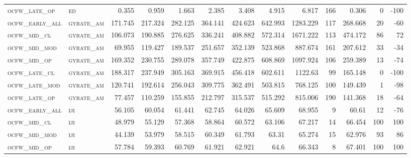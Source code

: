 \begin{landscape}
\begin{center}
\begin{footnotesize}
\begin{longtable}{llrrrrrrrr|rrr}
\textsc{ocfw\_late\_op  } & \textsc{ed        }   & 0.355    & 0.959    & 1.663    & 2.385    & 3.408    & 4.915    & 6.817    & 166    & 0.306         & 0             & -100            \\
\textsc{ocfw\_early\_all} & \textsc{gyrate\_am}   & 171.745  & 217.324  & 282.125  & 364.141  & 424.623  & 642.993  & 1283.229 & 117    & 268.668       & 20            & -60             \\
\textsc{ocfw\_mid\_cl   } & \textsc{gyrate\_am}   & 106.073  & 190.885  & 276.625  & 336.241  & 408.882  & 572.314  & 1671.222 & 113    & 474.172       & 86            & 72              \\
\textsc{ocfw\_mid\_mod  } & \textsc{gyrate\_am}   & 69.955   & 119.427  & 189.537  & 251.657  & 352.139  & 523.868  & 887.674  & 161    & 207.612       & 33            & -34             \\
\textsc{ocfw\_mid\_op   } & \textsc{gyrate\_am}   & 169.352  & 230.755  & 289.078  & 357.749  & 422.875  & 608.869  & 1097.924 & 106    & 259.389       & 13            & -74             \\
\textsc{ocfw\_late\_cl  } & \textsc{gyrate\_am}   & 188.317  & 237.949  & 305.163  & 369.915  & 456.418  & 602.611  & 1122.63  & 99     & 165.148       & 0             & -100            \\
\textsc{ocfw\_late\_mod } & \textsc{gyrate\_am}   & 120.741  & 192.614  & 256.043  & 309.775  & 362.491  & 503.815  & 768.125  & 100    & 149.439       & 1             & -98             \\
\textsc{ocfw\_late\_op  } & \textsc{gyrate\_am}   & 77.457   & 110.259  & 155.855  & 212.797  & 315.537  & 515.292  & 815.006  & 190    & 141.368       & 18            & -64             \\
\textsc{ocfw\_early\_all} & \textsc{iji       }   & 56.105   & 60.054   & 61.441   & 62.745   & 64.026   & 65.609   & 68.955   & 9      & 60.61         & 12            & -76             \\
\textsc{ocfw\_mid\_cl   } & \textsc{iji       }   & 48.979   & 55.129   & 57.368   & 58.864   & 60.572   & 63.106   & 67.217   & 14     & 66.454        & 100           & 100             \\
\textsc{ocfw\_mid\_mod  } & \textsc{iji       }   & 44.139   & 53.979   & 58.515   & 60.349   & 61.793   & 63.31    & 65.274   & 15     & 62.976        & 93            & 86              \\
\textsc{ocfw\_mid\_op   } & \textsc{iji       }   & 57.784   & 59.393   & 60.769   & 61.921   & 62.921   & 64.6     & 66.343   & 8      & 67.401        & 100           & 100             \\

\end{longtable}
\end{footnotesize}
\end{center}
\end{landscape}
